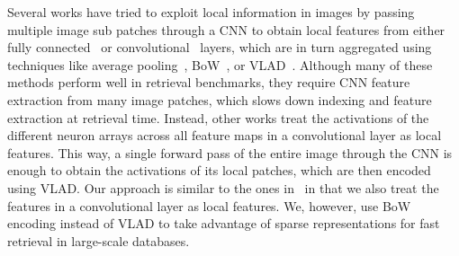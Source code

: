 \documentclass{sig-arxiv}
\begin{document}
Several works have tried to exploit local information in images by passing multiple image sub patches through a CNN to obtain local features from either fully connected~\cite{cnnofftheshelf, deepindex} or convolutional~\cite{gong2014multi} layers, which are in turn aggregated using techniques like average pooling~\cite{cnnofftheshelf}, BoW~\cite{deepindex}, or VLAD~\cite{gong2014multi}. Although many of these methods perform well in retrieval benchmarks, they require CNN feature extraction from many image patches, which slows down indexing and feature extraction at retrieval time. Instead, other works \cite{ng2015, netvlad} treat the activations of the different neuron arrays across all feature maps in a convolutional layer as local features. This way, a single forward pass of the entire image through the CNN is enough to obtain the activations of its local patches, which are then encoded using VLAD. Our approach is similar to the ones in~\cite{ng2015,netvlad} in that we also treat the features in a convolutional layer as local features. We, however, use BoW encoding instead of VLAD to take advantage of sparse representations for fast retrieval in large-scale databases.
\end{document}
